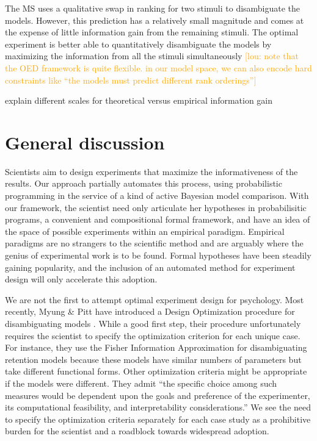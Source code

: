 \documentclass{article}
\newcommand{\lou}[1]{\textcolor{orange}{[lou: #1]}}
\newcommand{\cas}[1]{ \textsf{\color{darkgray} \scriptsize #1} }
\begin{document}
The MS uses a qualitative swap in ranking for two stimuli to disambiguate the models.
However, this prediction has a relatively small magnitude and comes at the expense of little information gain from the remaining stimuli.
The optimal experiment is better able to quantitatively disambiguate the models by maximizing the information from all the stimuli simultaneously
\lou{note that the OED framework is quite flexible. in our model space, we can also encode hard constraints like ``the models must predict different rank orderings''}


\cas{explain different scales for theoretical versus empirical information gain}




\section{General discussion}

%



Scientists aim to design experiments that maximize the informativeness of the results.
Our approach partially automates this process, using probabilistic programming in the service of a kind of active Bayesian model comparison.
With our framework, the scientist need only articulate her hypotheses in probabilisitic programs, a convenient and compositional formal framework, and have an idea of the space of possible experiments within an empirical paradigm.
Empirical paradigms are no strangers to the scientific method and are arguably where the genius of experimental work is to be found.
Formal hypotheses have been steadily gaining popularity, and the inclusion of an automated method for experiment design will only accelerate this adoption.

We are not the first to attempt optimal experiment design for psychology.
Most recently, Myung \& Pitt have introduced a Design Optimization procedure for disambiguating models \cite{Myung2009}.
While a good first step, their procedure unfortunately requires the scientist to specify the optimization criterion for each unique case. For instance, they use the Fisher Information Approximation for disambiguating retention models because these models have similar numbers of parameters but take different functional forms. Other optimization criteria might be appropriate if the models were different. They admit ``the specific choice among such measures would be dependent upon the goals and preference of the experimenter, its computational feasibility, and interpretability considerations.''
We see the need to specify the optimization criteria separately for each case study as a prohibitive burden for the scientist and a roadblock towards widespread adoption.
\end{document}
